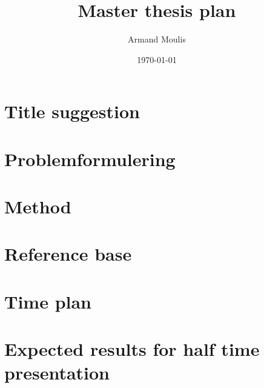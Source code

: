 \documentclass{report}
\begin{document}
	


\title{Master thesis plan}
\author{Armand Moulis}
\date{\today}
\maketitle

\tableofcontents
\newpage
\setcounter{page}{1}



\section{Title suggestion}
\section{Problemformulering}
\section{Method}
\section{Reference base}
\section{Time plan}

\section{Expected results for half time presentation}




\end{document}

